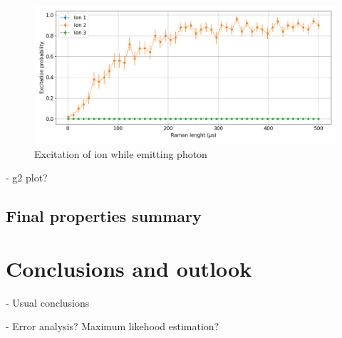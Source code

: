 \documentclass[english, a4paper, 12pt, twoside]{book}
\numberwithin{equation}{section} %
\begin{document}
\begin{figure}[H]
\centering
\includegraphics[width=\textwidth]{img/ramanlength_witherrors}
\caption{Excitation of ion while emitting photon}
\end{figure}

- g2 plot?
\section{Final properties summary}

\chapter{Conclusions and outlook}
- Usual conclusions

\newpage




\newpage
\renewcommand{\appendixpagename}{Appendix} %
\renewcommand{\appendixtocname}{Appendix} %
\appendixpage
\addappheadtotoc


\begin{appendices}
- Error analysis? Maximum likehood estimation?
\end{appendices}
\end{document}
